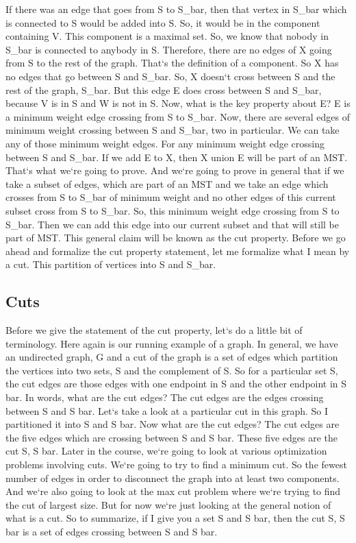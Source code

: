 If there was an edge that goes from S to S\_bar, then that vertex in S\_bar which is connected to S would be added into S\@.
So, it would be in the component containing V\@.
This component is a maximal set.
So, we know that nobody in S\_bar is connected to anybody in S\@.
Therefore, there are no edges of X going from S to the rest of the graph.
That`s the definition of a component.
So X has no edges that go between S and S\_bar.
So, X doesn`t cross between S and the rest of the graph, S\_bar.
But this edge E does cross between S and S\_bar, because V is in S and W is not in S\@.
Now, what is the key property about E? E is a minimum weight edge crossing from S to S\_bar.
Now, there are several edges of minimum weight crossing between S and S\_bar, two in particular.
We can take any of those minimum weight edges.
For any minimum weight edge crossing between S and S\_bar.
If we add E to X, then X union E will be part of an MST\@.
That`s what we`re going to prove.
And we`re going to prove in general that if we take a subset of edges, which are part of an MST and we take an edge which crosses from S to S\_bar of minimum weight and no other edges of this current subset cross from S to S\_bar.
So, this minimum weight edge crossing from S to S\_bar.
Then we can add this edge into our current subset and that will still be part of MST\@.
This general claim will be known as the cut property.
Before we go ahead and formalize the cut property statement, let me formalize what I mean by a cut.
This partition of vertices into S and S\_bar.

\subsection{Cuts}
Before we give the statement of the cut property, let`s do a little bit of terminology.
Here again is our running example of a graph.
In general, we have an undirected graph, G and a cut of the graph is a set of edges which partition the vertices into two sets, S and the complement of S\@.
So for a particular set S, the cut edges are those edges with one endpoint in S and the other endpoint in S bar.
In words, what are the cut edges? The cut edges are the edges crossing between S and S bar.
Let`s take a look at a particular cut in this graph.
So I partitioned it into S and S bar.
Now what are the cut edges? The cut edges are the five edges which are crossing between S and S bar.
These five edges are the cut S, S bar.
Later in the course, we`re going to look at various optimization problems involving cuts.
We`re going to try to find a minimum cut.
So the fewest number of edges in order to disconnect the graph into at least two components.
And we`re also going to look at the max cut problem where we`re trying to find the cut of largest size.
But for now we`re just looking at the general notion of what is a cut.
So to summarize, if I give you a set S and S bar, then the cut S, S bar is a set of edges crossing between S and S bar.


